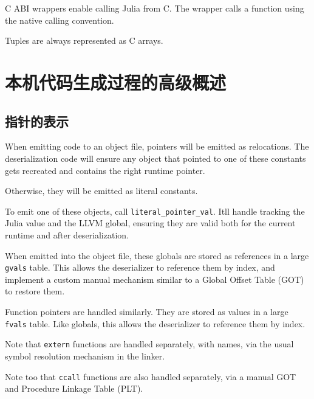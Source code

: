 C ABI wrappers enable calling Julia from C. The wrapper calls a function using the native calling convention.



Tuples are always represented as C arrays.



\hypertarget{937983670031722699}{}


\section{本机代码生成过程的高级概述}



\hypertarget{10925450738979772529}{}


\subsection{指针的表示}



When emitting code to an object file, pointers will be emitted as relocations. The deserialization code will ensure any object that pointed to one of these constants gets recreated and contains the right runtime pointer.



Otherwise, they will be emitted as literal constants.



To emit one of these objects, call \texttt{literal\_pointer\_val}. It{\textquotesingle}ll handle tracking the Julia value and the LLVM global, ensuring they are valid both for the current runtime and after deserialization.



When emitted into the object file, these globals are stored as references in a large \texttt{gvals} table. This allows the deserializer to reference them by index, and implement a custom manual mechanism similar to a Global Offset Table (GOT) to restore them.



Function pointers are handled similarly. They are stored as values in a large \texttt{fvals} table. Like globals, this allows the deserializer to reference them by index.



Note that \texttt{extern} functions are handled separately, with names, via the usual symbol resolution mechanism in the linker.



Note too that \texttt{ccall} functions are also handled separately, via a manual GOT and Procedure Linkage Table (PLT).



